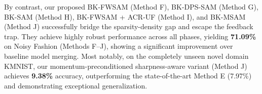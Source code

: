 \documentclass{article}
\theoremstyle{plain}
\theoremstyle{definition}
\theoremstyle{remark}
\begin{document}
By contrast, our proposed BK-FWSAM (Method F), BK-DPS-SAM (Method G), BK-SAM (Method H), BK-FWSAM + ACR-UF (Method I), and BK-MSAM (Method J) successfully bridge the sparsity-density gap and escape the feedback trap. They achieve highly robust performance across all phases, yielding \textbf{71.09\%} on Noisy Fashion (Methods F–J), showing a significant improvement over baseline model merging. Most notably, on the completely unseen novel domain KMNIST, our momentum-preconditioned sharpness-aware variant (Method J) achieves \textbf{9.38\%} accuracy, outperforming the state-of-the-art Method E (7.97\%) and demonstrating exceptional generalization.

\begin{table}[tb]
  \caption{Multi-Noise Robustness Sweep: Overall Accuracies (\%) across different environmental noise intensities $\sigma \in \{0.2, 0.4, 0.6, 0.8\}$.}
  \label{tab:multinoise}
  \vskip 0.15in
  \begin{center}
    \begin{small}
    \end{small}
  \end{center}
  \vskip -0.1in
\end{table}
\end{document}
